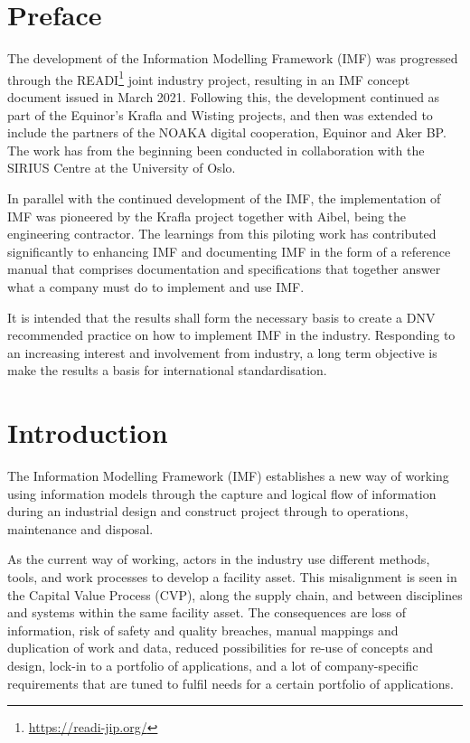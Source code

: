 \documentclass[../main.tex]{subfiles}
\begin{document}
\chapter{Preface}
The development of the Information Modelling Framework (IMF) was progressed through the
READI\footnote{\url{https://readi-jip.org/}} joint industry project, resulting in an IMF concept document issued in March
2021. Following this, the development continued as part of the Equinor's Krafla and Wisting projects, and then was
extended to include the partners of the NOAKA digital cooperation, Equinor and Aker BP. The work has from the beginning been conducted in collaboration with the SIRIUS Centre at the
University of Oslo. 

In parallel with the continued development of the IMF, the
implementation of IMF was pioneered by the Krafla project together with Aibel, being the engineering contractor.
The learnings from this piloting work has contributed significantly to enhancing IMF and documenting IMF in the form of a
reference manual that comprises documentation and specifications that together answer what a company must do to
implement and use IMF.

It is intended that the results shall form the necessary basis to create a DNV recommended practice
    on how to implement IMF in the industry. Responding to an increasing interest and involvement from industry, a long term objective is make the results a basis for international standardisation.

\chapter{Introduction}
The Information Modelling Framework (IMF) establishes a new way of working using information models through the capture and logical flow of information during an industrial design and construct project through to operations, maintenance and disposal.

As the current way of working, 
actors in the industry use different methods, tools, and work processes to develop a facility asset. This misalignment is seen in the Capital Value Process (CVP), along the supply chain, and between disciplines and systems within the same facility asset. The consequences are loss of information, risk of safety and quality breaches, manual mappings and duplication of work and data, reduced possibilities for re-use of concepts and design, lock-in to a portfolio of applications, and a lot of company-specific requirements that are tuned to fulfil needs for a certain portfolio of applications.
\end{document}
